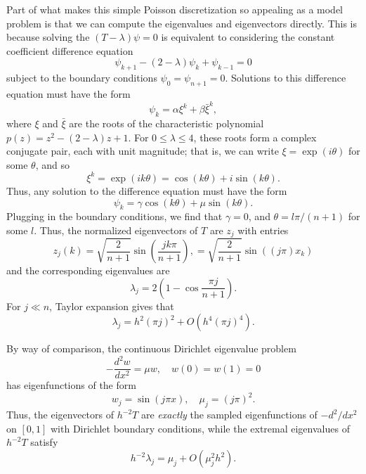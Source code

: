 Part of what makes this simple Poisson discretization so appealing as
a model problem is that we can compute the eigenvalues and eigenvectors
directly.  This is because solving the $(T-\lambda) \psi = 0$ is
equivalent to considering the constant coefficient difference equation
\[
  \psi_{k+1} - (2-\lambda) \psi_k + \psi_{k-1} = 0
\]
subject to the boundary conditions $\psi_0 = \psi_{n+1} = 0$.  Solutions to
this difference equation must have the form
\[
  \psi_{k} = \alpha \xi^k + \beta \bar{\xi}^k,
\]
where $\xi$ and $\bar{\xi}$ are the roots of the characteristic
polynomial $p(z) = z^2 - (2-\lambda) z + 1$.  For $0 \leq \lambda \leq 4$,
these roots form a complex conjugate pair, each with unit magnitude;
that is, we can write $\xi = \exp(i\theta)$ for some $\theta$, and so
\[
  \xi^k = \exp(ik\theta) = \cos(k\theta) + i \sin(k\theta).
\]
Thus, any solution to the difference equation must have the form
\[
  \psi_{k} = \gamma \cos(k\theta) + \mu \sin(k\theta).
\]
Plugging in the boundary conditions, we find that $\gamma = 0$,
and $\theta = l\pi/(n+1)$ for some $l$.  Thus, the normalized eigenvectors
of $T$ are $z_j$ with entries
\[
  z_j(k) = \sqrt{\frac{2}{n+1}} \sin\left( \frac{jk\pi}{n+1} \right),
         = \sqrt{\frac{2}{n+1}} \sin( (j\pi) x_k )
\]
and the corresponding eigenvalues are
\[
  \lambda_j = 2 \left( 1 - \cos \frac{\pi j}{n+1} \right).
\]
For $j \ll n$, Taylor expansion gives that
\[
  \lambda_j = h^2 (\pi j)^2 + O\left( h^4 (\pi j)^4 \right).
\]

By way of comparison, the continuous Dirichlet eigenvalue
problem
\[
  -\frac{d^2 w}{dx^2} = \mu w, \quad w(0) = w(1) = 0
\]
has eigenfunctions of the form
\[
  w_j = \sin(j\pi x), \quad \mu_j = (j \pi)^2.
\]
Thus, the eigenvectors of $h^{-2} T$ are {\em exactly} the sampled
eigenfunctions of $-d^2/dx^2$ on $[0,1]$ with Dirichlet boundary
conditions, while the extremal eigenvalues of $h^{-2} T$ satisfy
\[
  h^{-2} \lambda_j = \mu_j + O(\mu_j^2 h^2).
\]
